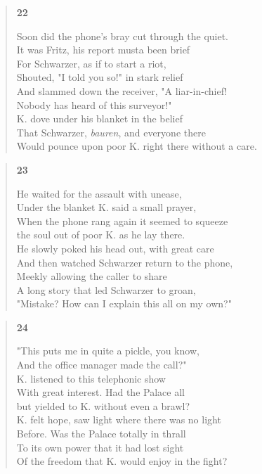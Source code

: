 \documentclass{article}
\begin{document}
\begin{verse}
  \begin{center}
    \textbf{22} \\
  \end{center}
  Soon did the phone’s bray cut through the quiet. \\
  It was Fritz, his report musta been brief \\
  For Schwarzer, as if to start a riot, \\
  Shouted, "I told you so!" in stark relief \\
  And slammed down the receiver, "A liar-in-chief! \\
  Nobody has heard of this surveyor!" \\
  K. dove under his blanket in the belief \\
  That Schwarzer, \textit{bauren}, and everyone there \\
  Would pounce upon poor K. right there without a care.
\end{verse}

\begin{verse}
  \begin{center}
    \textbf{23} \\
  \end{center}
  He waited for the assault with unease, \\
  Under the blanket K. said a small prayer, \\
  When the phone rang again it seemed to squeeze \\
  the soul out of poor K. as he lay there. \\
  He slowly poked his head out, with great care \\
  And then watched Schwarzer return to the phone, \\
  Meekly allowing the caller to share \\
  A long story that led Schwarzer to groan, \\
  "Mistake? How can I explain this all on my own?"
\end{verse}

\newpage

\begin{verse}
  \begin{center}
    \textbf{24} \\
  \end{center}
  "This puts me in quite a pickle, you know, \\
  And the office manager made the call?" \\
  K. listened to this telephonic show \\
  With great interest. Had the Palace all \\
  but yielded to K. without even a brawl? \\
  K. felt hope, saw light where there was no light \\
  Before. Was the Palace totally in thrall \\
  To its own power that it had lost sight \\
  Of the freedom that K. would enjoy in the fight?
\end{verse}
\end{document}
